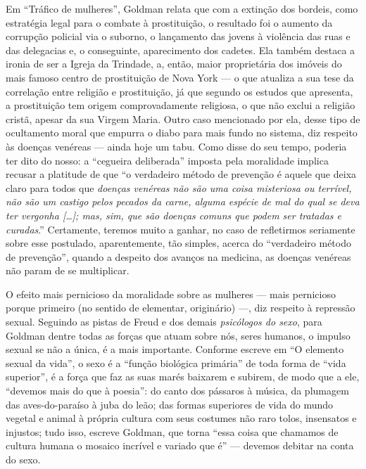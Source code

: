 Em ``Tráfico de mulheres'', Goldman
relata que com a extinção dos bordeis, como estratégia legal para o
combate à prostituição, o resultado foi o aumento da corrupção policial
via o suborno, o lançamento das jovens à violência das ruas e das
delegacias e, o conseguinte, aparecimento dos cadetes. Ela também
destaca a ironia de ser a Igreja da Trindade, a, então, maior
proprietária dos imóveis do mais famoso centro de prostituição de Nova
York --- o que atualiza a sua tese da correlação entre religião e
prostituição, já que segundo os estudos que apresenta, a prostituição
tem origem comprovadamente religiosa, o que não exclui a religião
cristã, apesar da sua Virgem Maria. Outro caso mencionado por ela, desse
tipo de ocultamento moral que empurra o diabo para mais fundo no
sistema, diz respeito às doenças venéreas --- ainda hoje um tabu. Como
disse do seu tempo, poderia ter dito do nosso: a ``cegueira deliberada''
imposta pela moralidade implica recusar a platitude de que ``o
verdadeiro método de prevenção é aquele que deixa claro para todos que
\textit{doenças venéreas não são uma coisa misteriosa ou terrível, não são um
castigo pelos pecados da carne, alguma espécie de mal do qual se deva
ter vergonha {[}\ldots{]}; mas, sim, que são doenças comuns que podem ser
tratadas e curadas}.'' Certamente, teremos muito a ganhar, no caso de
refletirmos seriamente sobre esse postulado, aparentemente, tão simples,
acerca do ``verdadeiro método de prevenção'', quando a despeito dos
avanços na medicina, as doenças venéreas não param de se multiplicar.

O efeito mais pernicioso da moralidade sobre as mulheres --- mais
pernicioso porque primeiro (no sentido de elementar, originário) ---, diz
respeito à repressão sexual. Seguindo as pistas de Freud e dos demais
\textit{psicólogos do sexo}, para Goldman dentre todas as forças que atuam
sobre nós, seres humanos, o impulso sexual se não a única, é a mais
importante. Conforme escreve em ``O elemento sexual da vida'', o sexo é
a ``função biológica primária'' de toda forma de ``vida superior'', é a
força que faz as suas marés baixarem e subirem, de modo que a ele,
``devemos mais do que à poesia'': do canto dos pássaros à música, da
plumagem das aves-do-paraíso à juba do leão; das formas superiores de
vida do mundo vegetal e animal à própria cultura com seus costumes não
raro tolos, insensatos e injustos; tudo isso, escreve Goldman, que torna
``essa coisa que chamamos de cultura humana o mosaico incrível e variado
que é'' --- devemos debitar na conta do sexo. 

